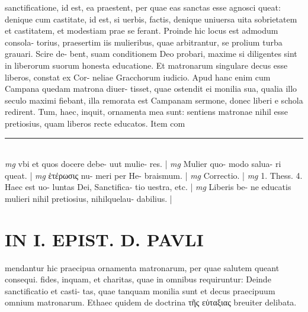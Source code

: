 \documentclass{article}
\begin{document}
\begin{pages}
sanctificatione, id est, ea praestent, per quae eas sanctas esse agnosci queat: denique  cum castitate, id est, si uerbis, factis, denique  uniuersa uita sobrietatem et castitatem, et modestiam prae se ferant. Proinde hic locus est admodum consola- torius, praesertim iis mulieribus, quae arbitrantur, se prolium turba grauari. Scire de- bent, suam conditionem Deo probari, maxime si diligentes sint in liberorum suorum honesta educatione. Et matronarum singulare decus esse liberos, constat ex Cor- neliae Gracchorum iudicio. Apud hanc enim cum Campana quedam matrona diuer- tisset, quae ostendit ei monilia sua, qualia illo seculo maximi fiebant, illa remorata est Campanam sermone, donec liberi e schola redirent. Tum, haec, inquit, ornamenta mea sunt: sentiens matronae nihil esse pretiosius, quam liberos recte educatos. Item com  \pend
\vspace{0.5cm}\noindent
\vspace{0.2cm}\rule{1cm}{0.2pt}\\ 
\hspace{0.2cm}\textit{mg}
\footnotesize vbi  et quos docere debe- uut mulie- res. 
\normalsize| 
\hspace{0.2cm}\textit{mg}
\footnotesize Mulier quo- modo salua- ri queat. 
\normalsize| 
\hspace{0.2cm}\textit{mg}
\footnotesize ἑτέρωσις nu- meri per He- braismum. 
\normalsize| 
\hspace{0.2cm}\textit{mg}
\footnotesize Correctio. 
\normalsize| 
\hspace{0.2cm}\textit{mg}
\footnotesize 1. Thess. 4. Haec est uo- luntas Dei, Sanctifica- tio uestra, etc. 
\normalsize| 
\hspace{0.2cm}\textit{mg}
\footnotesize Liberis be- ne educatis mulieri nihil pretiosius, nihilquelau- dabilius. 
\normalsize| 
\section*{IN I. EPIST. D. PAVLI }
\marginpar{[ p.74 ]}\pstart mendantur hic praecipua ornamenta matronarum, per quae salutem queant consequi. fides, inquam, et charitas, quae in omnibus requiruntur: Deinde sanctificatio et casti- tas, quae tanquam monilia sunt et decus praecipuum omnium matronarum. Ethaec quidem de doctrina τῆς εὐταξιας  breuiter delibata.  \pend
{}
{}

\end{pages}
\end{document}
